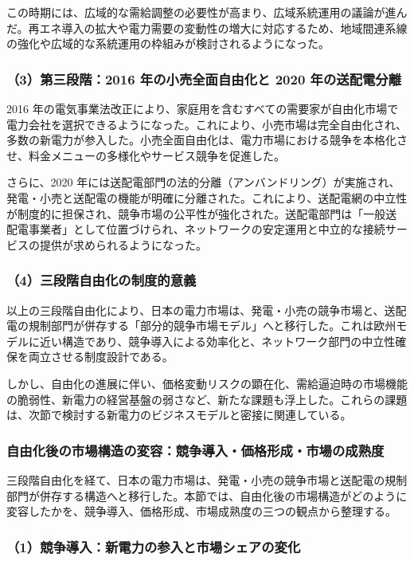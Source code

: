 この時期には、広域的な需給調整の必要性が高まり、広域系統運用の議論が進んだ。再エネ導入の拡大や電力需要の変動性の増大に対応するため、地域間連系線の強化や広域的な系統運用の枠組みが検討されるようになった。

\subsubsection{（3）第三段階：2016 年の小売全面自由化と 2020 年の送配電分離}

2016 年の電気事業法改正により、家庭用を含むすべての需要家が自由化市場で電力会社を選択できるようになった。これにより、小売市場は完全自由化され、多数の新電力が参入した。小売全面自由化は、電力市場における競争を本格化させ、料金メニューの多様化やサービス競争を促進した\parencite{METI2016FullRetail}。

さらに、2020 年には送配電部門の法的分離（アンバンドリング）が実施され、発電・小売と送配電の機能が明確に分離された。これにより、送配電網の中立性が制度的に担保され、競争市場の公平性が強化された。送配電部門は「一般送配電事業者」として位置づけられ、ネットワークの安定運用と中立的な接続サービスの提供が求められるようになった\parencite{METI2020Unbundling}。

\subsubsection{（4）三段階自由化の制度的意義}

以上の三段階自由化により、日本の電力市場は、発電・小売の競争市場と、送配電の規制部門が併存する「部分的競争市場モデル」へと移行した。これは欧州モデルに近い構造であり、競争導入による効率化と、ネットワーク部門の中立性確保を両立させる制度設計である。

しかし、自由化の進展に伴い、価格変動リスクの顕在化、需給逼迫時の市場機能の脆弱性、新電力の経営基盤の弱さなど、新たな課題も浮上した。これらの課題は、次節で検討する新電力のビジネスモデルと密接に関連している。

\subsubsection{自由化後の市場構造の変容：競争導入・価格形成・市場の成熟度}

三段階自由化を経て、日本の電力市場は、発電・小売の競争市場と送配電の規制部門が併存する構造へと移行した。本節では、自由化後の市場構造がどのように変容したかを、競争導入、価格形成、市場成熟度の三つの観点から整理する。

\subsubsection{（1）競争導入：新電力の参入と市場シェアの変化}

